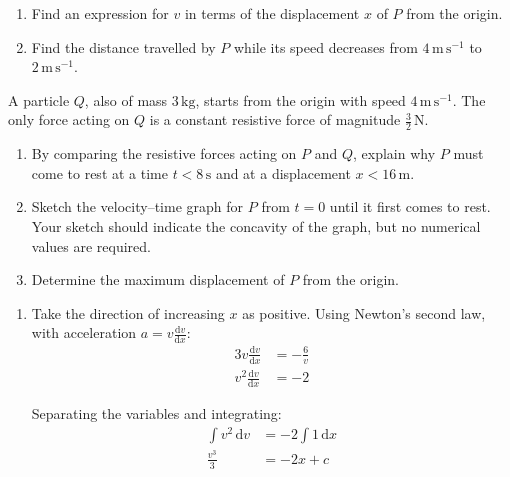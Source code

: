 \documentclass[leqno]{article}
\begin{document}
\begin{enumerate}[
  label=\textbf{\arabic*.},
  leftmargin=*,
  topsep=0pt,
  partopsep=0pt,
  parsep=0pt
]
\begin{enumerate}[label=\textbf{(\alph*)}]
  \item Find an expression for $v$ in terms of the displacement $x$ of $P$ from the origin.  \\
  \item Find the distance travelled by $P$ while its speed decreases from $4\,\mathrm{m\,s^{-1}}$ to $2\,\mathrm{m\,s^{-1}}$.  \\
\end{enumerate}
A particle $Q$, also of mass $3\,\mathrm{kg}$, starts from the origin with speed $4\,\mathrm{m\,s^{-1}}$. The only force acting on $Q$ is a constant resistive force of magnitude $\frac{3}{2}\,\mathrm{N}$. \\
\begin{enumerate}[label=\textbf{(\alph*)}, resume]
  \item By comparing the resistive forces acting on $P$ and $Q$, explain why $P$ must come to rest at a time $t<8\,\mathrm{s}$ and at a displacement $x<16\,\mathrm{m}$.  \\
  \item Sketch the velocity--time graph for $P$ from $t=0$ until it first comes to rest. Your sketch should indicate the concavity of the graph, but no numerical values are required.  \\
  \item Determine the maximum displacement of $P$ from the origin.  \\
\end{enumerate}

\vspace*{10pt}

\begin{djsSolution}
\begin{enumerate}[label=\textbf{(\alph*)}, start=1]
\item Take the direction of increasing \(x\) as positive. Using Newton's second law, with acceleration \(a=v\frac{\mathrm{d}v}{\mathrm{d}x}\):
\begin{align*}
3v\frac{\mathrm{d}v}{\mathrm{d}x}&=-\frac{6}{v}\\
v^2\frac{\mathrm{d}v}{\mathrm{d}x}&=-2
\end{align*}

Separating the variables and integrating:
\begin{align*}
\int v^2\,\mathrm{d}v&=-2\int 1\,\mathrm{d}x\\
\frac{v^3}{3}&=-2x+c
\end{align*}


\end{enumerate}
\end{djsSolution}
\end{enumerate}
\end{document}
